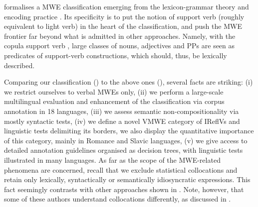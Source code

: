 \documentclass[output=paper,modfonts]{langscibook}
\begin{document}
\citet{Laporte:forth} formalises a MWE classification emerging from the lexicon-grammar theory and encoding practice \citep{Gross:1986:LRC:991365.991367,gross:hal-00621380}. Its specificity is to put the notion of support verb (roughly equivalent to light verb) in the heart of the classification, and push the MWE frontier far beyond what is admitted in other approaches. Namely, with the copula support verb , large classes of nouns, adjectives and PPs are seen as predicates of support-verb constructions, which should, thus, be lexically described.

Comparing our classification () to the above ones (), several facts are striking: (i) we restrict ourselves to verbal MWEs only, (ii) we perform a large-scale multilingual evaluation and enhancement of the classification via corpus annotation in 18 languages, (iii) we assess semantic non-compositionality via mostly syntactic tests, (iv) we define a novel VMWE category of IReflVs and linguistic tests delimiting its borders, we also display the quantitative importance of this category, mainly in Romance and Slavic languages, (v) we give access to detailed annotation guidelines organised as decision trees, with linguistic tests illustrated in many languages. As far as the scope of the MWE-related phenomena are concerned, recall that we exclude statistical collocations and retain only lexically, syntactically or semantically idiosyncratic expressions. This fact seemingly contrasts with other approaches shown in . Note, however, that some of these authors understand collocations differently, as discussed in . 

\end{document}

